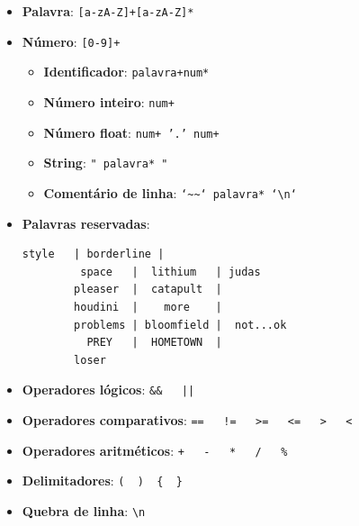 \documentclass[a4paper,12pt]{article}
\begin{document}
\begin{itemize}

    \item \textbf{Palavra}:  
    \texttt{[a-zA-Z]+[a-zA-Z]*}

    \item \textbf{Número}:  
    \texttt{[0-9]+}

    \begin{itemize}
        \item \textbf{Identificador}:  
        \texttt{palavra+num*}
        
        \item \textbf{Número inteiro}:  
        \texttt{num+}

        \item \textbf{Número float}:  
        \texttt{num+ '.' num+}
        
        \item \textbf{String}:  
        \texttt{" palavra* "}
        
        \item \textbf{Comentário de linha}:
        \texttt{`\~{}\~{}` palavra* `\textbackslash n`}
    \end{itemize}
    
    \item \textbf{Palavras reservadas}:
        \begin{lstlisting}[basicstyle=\ttfamily\footnotesize]
         style   | borderline |
         space   |  lithium   | judas
        pleaser  |  catapult  |
        houdini  |    more    |
        problems | bloomfield |  not...ok
          PREY   |  HOMETOWN  |
        loser
        \end{lstlisting}

    \item \textbf{Operadores lógicos}:
    \texttt{\&{}\&{} \ \ ||}
        
    \item \textbf{Operadores comparativos}:
    \texttt{== \ \ !=  \ \ >= \ \ <= \ \ > \ \ <}

    \item \textbf{Operadores aritméticos}:
    \texttt{+ \ \ - \ \ * \ \ / \ \ \%}

    \item \textbf{Delimitadores}:
    \texttt{( \ ) \ \{ \ \}}

    \item \textbf{Quebra de linha}:
    \texttt{\textbackslash n}

\end{itemize}
\end{document}
